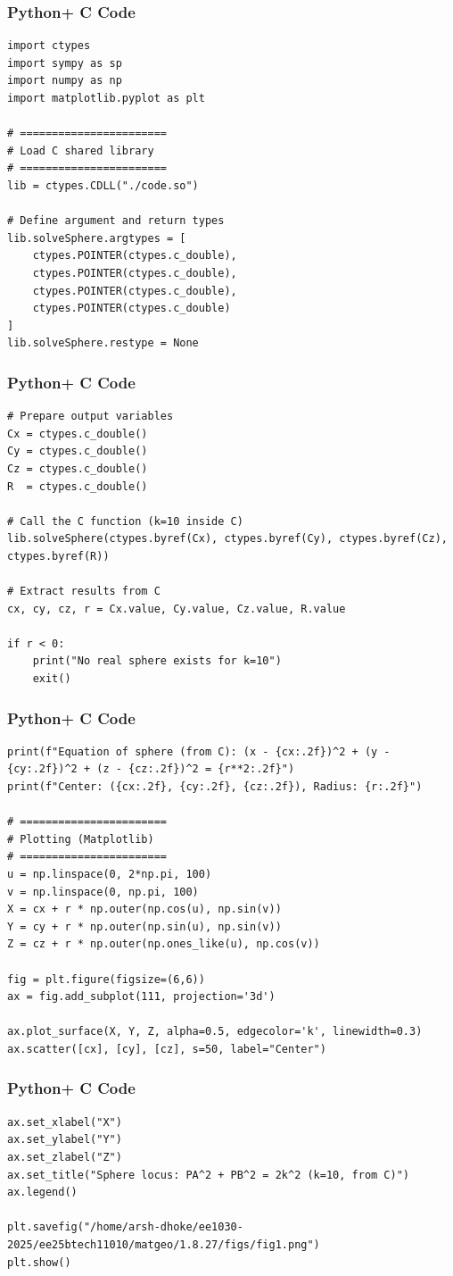 \documentclass{beamer}
\begin{document}
\begin{frame}[fragile]
    \frametitle{Python+ C Code}
\begin{lstlisting}
import ctypes
import sympy as sp
import numpy as np
import matplotlib.pyplot as plt

# =======================
# Load C shared library
# =======================
lib = ctypes.CDLL("./code.so")

# Define argument and return types
lib.solveSphere.argtypes = [
    ctypes.POINTER(ctypes.c_double),
    ctypes.POINTER(ctypes.c_double),
    ctypes.POINTER(ctypes.c_double),
    ctypes.POINTER(ctypes.c_double)
]
lib.solveSphere.restype = None
\end{lstlisting}
\end{frame}

\begin{frame}[fragile]
    \frametitle{Python+ C Code}
\begin{lstlisting}
# Prepare output variables
Cx = ctypes.c_double()
Cy = ctypes.c_double()
Cz = ctypes.c_double()
R  = ctypes.c_double()

# Call the C function (k=10 inside C)
lib.solveSphere(ctypes.byref(Cx), ctypes.byref(Cy), ctypes.byref(Cz), ctypes.byref(R))

# Extract results from C
cx, cy, cz, r = Cx.value, Cy.value, Cz.value, R.value

if r < 0:
    print("No real sphere exists for k=10")
    exit()
\end{lstlisting}
\end{frame}

\begin{frame}[fragile]
    \frametitle{Python+ C Code}
\begin{lstlisting}
print(f"Equation of sphere (from C): (x - {cx:.2f})^2 + (y - {cy:.2f})^2 + (z - {cz:.2f})^2 = {r**2:.2f}")
print(f"Center: ({cx:.2f}, {cy:.2f}, {cz:.2f}), Radius: {r:.2f}")

# =======================
# Plotting (Matplotlib)
# =======================
u = np.linspace(0, 2*np.pi, 100)
v = np.linspace(0, np.pi, 100)
X = cx + r * np.outer(np.cos(u), np.sin(v))
Y = cy + r * np.outer(np.sin(u), np.sin(v))
Z = cz + r * np.outer(np.ones_like(u), np.cos(v))

fig = plt.figure(figsize=(6,6))
ax = fig.add_subplot(111, projection='3d')

ax.plot_surface(X, Y, Z, alpha=0.5, edgecolor='k', linewidth=0.3)
ax.scatter([cx], [cy], [cz], s=50, label="Center")

\end{lstlisting}
\end{frame}


\begin{frame}[fragile]
    \frametitle{Python+ C Code}
\begin{lstlisting}
ax.set_xlabel("X")
ax.set_ylabel("Y")
ax.set_zlabel("Z")
ax.set_title("Sphere locus: PA^2 + PB^2 = 2k^2 (k=10, from C)")
ax.legend()

plt.savefig("/home/arsh-dhoke/ee1030-2025/ee25btech11010/matgeo/1.8.27/figs/fig1.png")
plt.show()
\end{lstlisting}
\end{frame}
\end{document}

